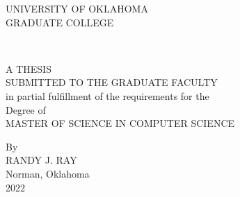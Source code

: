 \thispagestyle{empty}

\begin{center}
UNIVERSITY OF OKLAHOMA \\
\bigskip
GRADUATE COLLEGE \\

\vspace{1.5in}

\MakeUppercase{\mytitle{}} \\

\vspace{1.5in}

A THESIS \\
\bigskip
SUBMITTED TO THE GRADUATE FACULTY \\
\bigskip
in partial fulfillment of the requirements for the \\
\bigskip
Degree of \\
\bigskip
MASTER OF SCIENCE IN COMPUTER SCIENCE \\


\vfill

By \\
\bigskip
RANDY J. RAY \\
Norman, Oklahoma \\
2022 \\
\end{center}
\pagebreak
